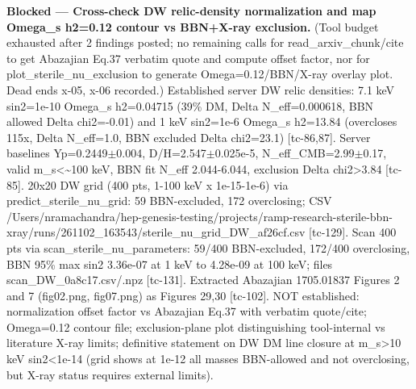 \documentclass[11pt,a4paper]{article}
\begin{document}
\textbf{Blocked --- Cross-check DW relic-density normalization and map Omega\_s h2=0.12 contour vs BBN+X-ray exclusion.} (Tool budget exhausted after 2 findings posted; no remaining calls for read\_arxiv\_chunk/cite to get Abazajian Eq.37 verbatim quote and compute offset factor, nor for plot\_sterile\_nu\_exclusion to generate Omega=0.12/BBN/X-ray overlay plot. Dead ends x-05, x-06 recorded.) Established server DW relic densities: 7.1 keV sin2=1e-10 Omega\_s h2=0.04715 (39\% DM, Delta N\_eff=0.000618, BBN allowed Delta chi2=-0.01) and 1 keV sin2=1e-6 Omega\_s h2=13.84 (overcloses 115x, Delta N\_eff=1.0, BBN excluded Delta chi2=23.1) [tc-86,87]. Server baselines Yp=0.2449$\pm$0.004, D/H=2.547$\pm$0.025e-5, N\_eff\_CMB=2.99$\pm$0.17, valid m\_s\textless{}\textasciitilde{}100 keV, BBN fit N\_eff 2.044-6.044, exclusion Delta chi2\textgreater{}3.84 [tc-85]. 20x20 DW grid (400 pts, 1-100 keV x 1e-15-1e-6) via predict\_sterile\_nu\_grid: 59 BBN-excluded, 172 overclosing; CSV /Users/nramachandra/hep-genesis-testing/projects/ramp-research-sterile-bbn-xray/runs/261102\_163543/sterile\_nu\_grid\_DW\_af26cf.csv [tc-129]. Scan 400 pts via scan\_sterile\_nu\_parameters: 59/400 BBN-excluded, 172/400 overclosing, BBN 95\% max sin2 3.36e-07 at 1 keV to 4.28e-09 at 100 keV; files scan\_DW\_0a8c17.csv/.npz [tc-131]. Extracted Abazajian 1705.01837 Figures 2 and 7 (fig02.png, fig07.png) as Figures 29,30 [tc-102]. NOT established: normalization offset factor vs Abazajian Eq.37 with verbatim quote/cite; Omega=0.12 contour file; exclusion-plane plot distinguishing tool-internal vs literature X-ray limits; definitive statement on DW DM line closure at m\_s\textgreater{}10 keV sin2\textless{}1e-14 (grid shows at 1e-12 all masses BBN-allowed and not overclosing, but X-ray status requires external limits).
\end{document}
